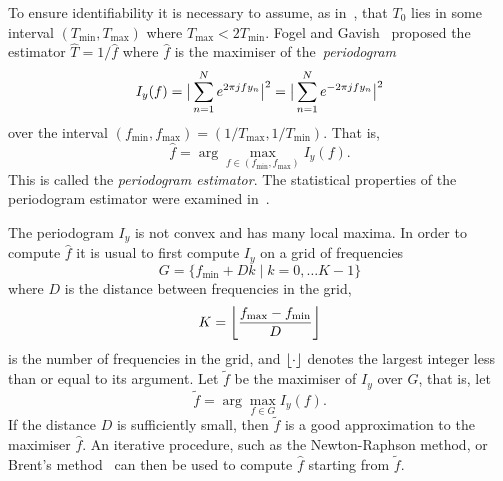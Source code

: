 \documentclass[10pt,twocolumn,twoside]{IEEEtran}
\begin{document}
To ensure identifiability it is necessary to assume, as in~\cite{Sidiropoulos2005}, that $T_0$ lies in some interval $(T_{\text{min}}, T_{\text{max}})$ where $T_{\text{max}} < 2T_{\text{min}}$.%
Fogel and Gavish~\cite{Fogel1988,Fogel1989_bit_synch_zero_crossings} proposed the estimator $\hat{T} = 1/\hat{f}$ where $\hat{f}$ is the maximiser of the~\emph{periodogram}
\[
I_y(f) = \big\vert  \sum_{n=1}^N e^{ 2\pi j f y_n}  \big\vert^2 = \big\vert  \sum_{n=1}^N e^{ -2\pi j f y_n}  \big\vert^2 
\]
over the interval $(f_{\text{min}}, f_{\text{max}}) = (1/T_{\text{max}}, 1/T_{\text{min}})$.  That is,
\[
\hat{f} = \arg\max_{f \in (f_{\text{min}}, f_{\text{max}})} I_y(f).
\] 
This is called the \emph{periodogram estimator}.  %
The statistical properties of the periodogram estimator were examined in~\cite{Quinn20013asilomar_period_est}.

The periodogram $I_y$ is not convex and has many local maxima.  In order to compute $\hat{f}$ it is usual to first compute $I_y$ on a grid of frequencies
\[
G = \{ f_{\text{min}} + Dk \mid k = 0, \dots K-1 \}
\]
where $D$ is the distance between frequencies in the grid, 
\[
K =  {\left\lfloor \frac{f_{\text{max}} - f_{\text{min}}}{D} \right\rfloor}
\]
is the number of frequencies in the grid, and ${\left\lfloor \cdot \right\rfloor}$ denotes the largest integer less than or equal to its argument.  
Let $\widetilde{f}$ be the maximiser of $I_y$ over $G$, that is, let
\[
\widetilde{f} = \arg\max_{f \in G} I_y(f).
\]
If the distance $D$ is sufficiently small, then $\widetilde{f}$ is a good approximation to the maximiser $\hat{f}$.  An iterative procedure, such as the Newton-Raphson method, or Brent's method~\cite[Ch.~5]{Brent_opt_no_derivs_1973} 
can then be used to compute $\hat{f}$ starting from $\widetilde{f}$.

\newcommand{\ymax}{y_{\text{max}}}
\newcommand{\ymin}{y_{\text{min}}}
\end{document}
